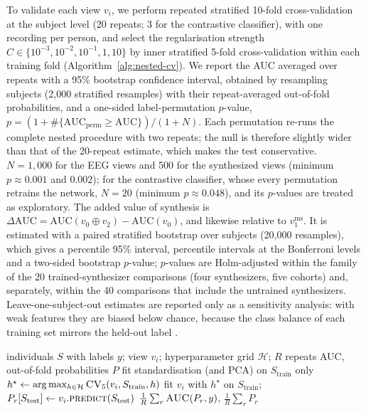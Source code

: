 \documentclass[pdflatex,referee,sn-basic]{sn-jnl}%
\begin{document}
To validate each view $v_i$, we perform repeated stratified 10-fold cross-validation at the subject level (20 repeats; 3 for the contrastive classifier), with one recording per person, and select the regularisation strength $C \in \{10^{-3},10^{-2},10^{-1},1,10\}$ by inner stratified 5-fold cross-validation within each training fold (Algorithm~\ref{alg:nested-cv}). We report the AUC averaged over repeats with a 95\% bootstrap confidence interval, obtained by resampling subjects (2,000 stratified resamples) with their repeat-averaged out-of-fold probabilities, and a one-sided label-permutation $p$-value, $p=(1+\#\{\mathrm{AUC}_{\mathrm{perm}}\geq\mathrm{AUC}\})/(1+N)$. Each permutation re-runs the complete nested procedure with two repeats; the null is therefore slightly wider than that of the 20-repeat estimate, which makes the test conservative. $N=1{,}000$ for the EEG views and 500 for the synthesized views (minimum $p\approx0.001$ and $0.002$); for the contrastive classifier, whose every permutation retrains the network, $N=20$ (minimum $p\approx0.048$), and its $p$-values are treated as exploratory. The added value of synthesis is $\Delta\mathrm{AUC}=\mathrm{AUC}(v_0\oplus v_2)-\mathrm{AUC}(v_0)$, and likewise relative to $v_1^{\mathrm{ms}}$. It is estimated with a paired stratified bootstrap over subjects (20,000 resamples), which gives a percentile 95\% interval, percentile intervals at the Bonferroni levels and a two-sided bootstrap $p$-value; $p$-values are Holm-adjusted within the family of the 20 trained-synthesizer comparisons (four synthesizers, five cohorts) and, separately, within the 40 comparisons that include the untrained synthesizers. Leave-one-subject-out estimates are reported only as a sensitivity analysis: with weak features they are biased below chance, because the class balance of each training set mirrors the held-out label \cite{varoquaux2018}.

\begin{algorithm}[t]
\caption{Nested repeated cross-validation for view $v_i$}
\label{alg:nested-cv}
\begin{algorithmic}[1]
\Require individuals $S$ with labels $y$; view $v_i$; hyperparameter grid $\mathcal{H}$; $R$ repeats
\Ensure AUC, out-of-fold probabilities $P$
     
        \State fit standardisation (and PCA) on $S_{\text{train}}$ only
        \State $h^\star \gets \arg\max_{h \in \mathcal{H}} \textsc{CV}_5(v_i, S_{\text{train}}, h)$ 
        \State fit $v_i$ with $h^\star$ on $S_{\text{train}}$; $P_r[S_{\text{test}}] \gets v_i.\textsc{predict}(S_{\text{test}})$
    \EndFor
\EndFor
\State \Return $\frac{1}{R}\sum_r \textsc{AUC}(P_r, y)$, $\frac{1}{R}\sum_r P_r$
\end{algorithmic}
\end{algorithm}
\end{document}
